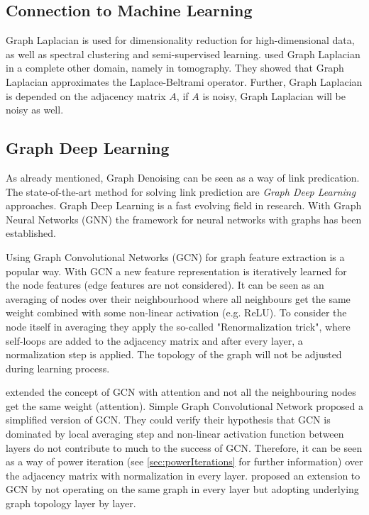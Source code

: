 \subsection{Connection to Machine Learning}

Graph Laplacian is used for dimensionality reduction for high-dimensional data, as well as spectral clustering and semi-supervised learning.
\citet{LaplaceRandomProjections} used Graph Laplacian in a complete other domain, namely in tomography. 
They showed that Graph Laplacian approximates the Laplace-Beltrami operator.
Further, Graph Laplacian is depended on the adjacency matrix $A$, if $A$ is noisy, Graph Laplacian will be noisy as well.

\subsection{Graph Deep Learning}
As already mentioned, Graph Denoising can be seen as a way of link predication. 
The state-of-the-art method for solving link prediction are \textit{Graph Deep Learning} approaches.
Graph Deep Learning is a fast evolving field in research. With Graph Neural Networks (GNN) \cite{GNN} the framework
for neural networks with graphs has been established. 

Using Graph Convolutional Networks (GCN) \cite{GCN} for graph feature extraction is a popular way. 
With GCN a new feature representation is iteratively learned for the node features (edge features are not considered).
It can be seen as an averaging of nodes over their neighbourhood where all neighbours get the same weight combined with some non-linear activation (e.g. ReLU). 
To consider the node itself in averaging they apply the so-called "Renormalization trick", where self-loops are added to the 
adjacency matrix and after every layer, a normalization step is applied. 
The topology of the graph will not be adjusted during  learning process.

\citet{GAT} extended the concept of GCN with attention and not all the neighbouring nodes get the same weight (attention).
Simple Graph Convolutional Network \cite{simpleGCN} proposed a simplified version of GCN.
They could verify their hypothesis that GCN is dominated by local averaging step and non-linear 
activation function between layers do not contribute to much to the success of GCN. 
Therefore, it can be seen as a way of power iteration (see \ref{sec:powerIterations} for further information) over the adjacency matrix with normalization in every layer.
\citet{dynamicGCN} proposed an extension to GCN by not operating on the same graph in every layer but adopting
underlying graph topology layer by layer.

